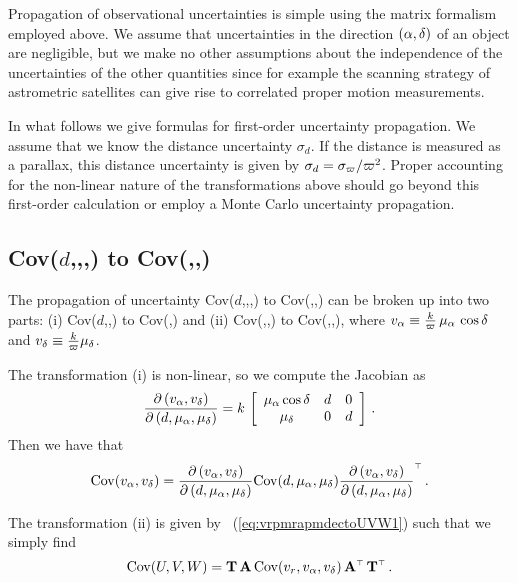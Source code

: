 Propagation of observational uncertainties is simple using the matrix
formalism employed above. We assume that uncertainties in the
direction $(\alpha,\delta)$ of an object are negligible, but we make no
other assumptions about the independence of the uncertainties of the
other quantities since for example the scanning strategy of
astrometric satellites can give rise to correlated proper motion
measurements.

In what follows we give formulas for first-order uncertainty
propagation. We assume that we know the distance uncertainty
$\sigma_d$. If the distance is measured as a parallax, this distance
uncertainty is given by $\sigma_d =
\sigma_{\varpi}/\varpi^2$. Proper accounting for the non-linear
nature of the transformations above should go beyond this first-order
calculation or employ a Monte Carlo uncertainty propagation.

\subsection{Cov($d$,\vrr,\pmra,\pmdec) to Cov(\galU,\galV,\galW)}

The propagation of uncertainty Cov($d$,\vrr,\pmra,\pmdec) to
Cov(\galU,\galV,\galW) can be broken up into two parts: (i)
Cov($d$,\pmra,\pmdec) to Cov(\vra,\vdec) and (ii) Cov(\vrr,\vra,\vdec)
to Cov(\galU,\galV,\galW), where $v_{\alpha} \equiv
\frac{k}{\varpi}\,\mu_{\alpha}\,\cos\delta$ and $v_{\delta} \equiv
\frac{k}{\varpi}\mu_{\delta}$.

The transformation (i) is non-linear, so we compute the Jacobian as
\begin{equation}
\frac{\partial \left(v_{\alpha},v_{\delta}\right)}{\partial\left(d,\mu_{\alpha},\mu_{\delta}\right)}
= k\,\left[ \begin{array}{ccc} \mu_{\alpha} \cos \delta & d & 0\\\mu_{\delta} & 0 & d\end{array} \right] \,.
\end{equation}
Then we have that
\begin{equation}
\mathrm{Cov}(v_{\alpha},v_{\delta}) = \frac{\partial \left(
  v_{\alpha},v_{\delta}\right)}{\partial \left(d,\mu_{\alpha},\mu_{\delta}\right)}
\mathrm{Cov}(d,\mu_{\alpha},\mu_{\delta}) \frac{\partial \left(
  v_{\alpha},v_{\delta}\right)}{\partial \left(d,\mu_{\alpha},\mu_{\delta}\right)}^{\scriptscriptstyle \top}\,.
\end{equation}

The transformation (ii) is given by
\eqnname~(\ref{eq:vrpmrapmdectoUVW1}) such that we simply find
\begin{equation}
\mathrm{Cov}(U,V,W) = \mathbf{T}\,\mathbf{A} \, \mathrm{Cov}(v_r,v_{\alpha},v_{\delta}) \, \mathbf{A}^{\scriptscriptstyle \top}\,\mathbf{T}^{\scriptscriptstyle \top}\,.
\end{equation}

